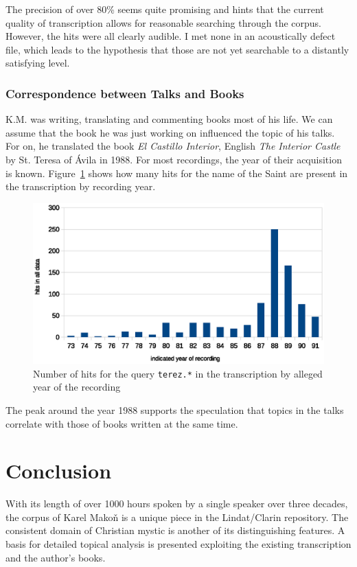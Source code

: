 \documentclass[a4paper,11pt]{article}
\begin{document}
The precision of over 80\% seems quite promising and hints that the current
quality of transcription allows for reasonable searching through the corpus.
However, the hits were all clearly audible. I met none in an acoustically defect
file, which leads to the hypothesis that those are not yet searchable to a
distantly satisfying level.

\subsubsection{Correspondence between Talks and Books}

K.M. was writing, translating and commenting books most of his life. We can
assume that the book he was just working on influenced the topic of his talks. 
For on, he translated the book \emph{El Castillo Interior}, English \emph{The
Interior Castle} by St. Teresa of Ávila in 1988. For most recordings, the year
of their acquisition is known.  Figure~\ref{fig:teresa-year} shows how many hits
for the name of the Saint are present in the transcription by recording year.

\begin{figure}[htpb]
\includegraphics[scale=0.6]{rc/teresa-by-year.eps}
\caption{Number of hits for the query \texttt{terez.*} in the transcription by
alleged year of the recording}
\label{fig:teresa-year}
\end{figure}

The peak around the year 1988 supports the speculation that topics in the talks
correlate with those of books written at the same time.

\section{Conclusion}

With its length of over 1000 hours spoken by a single speaker over three
decades, the corpus of Karel Mako\v{n} is a unique piece in the Lindat/Clarin
repository. The consistent domain of Christian mystic is another of its
distinguishing features. A basis for detailed topical analysis is presented
exploiting the existing transcription and the author's books.
\end{document}
